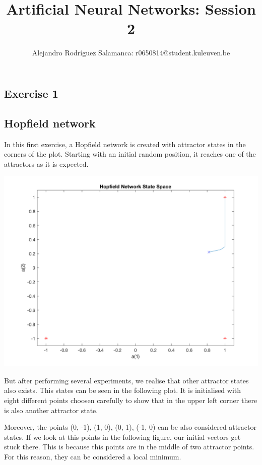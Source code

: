\documentclass[10pt]{article}
\author{Alejandro Rodríguez Salamanca: r0650814@student.kuleuven.be}
\date{}
\title{Artificial Neural Networks: Session 2}
\begin{document}
\maketitle
\begin{multicols}{2}

\section*{Exercise 1}

\subsection*{Hopfield network}

In this first exercise, a Hopfield network is created with attractor states in the corners of the plot. 
Starting with an initial random position, it reaches one of the attractors as it is expected.

\begin{center}
	\includegraphics[width=0.8\linewidth]{img/stable1}
\end{center}

But after performing several experiments, we realise that other attractor states also exists. This states can
be seen in the following plot. It is initialised with eight different points choosen carefully to show that 
in the upper left corner there is also another attractor state.

Moreover, the points (0, -1), (1, 0), (0, 1), (-1, 0) can be also considered attractor states.
If we look at this points in the following figure, our initial vectors get stuck there.
This is because this points are in the middle of two attractor points. For this reason, they can be considered a local minimum.


\end{multicols}
\end{document}
